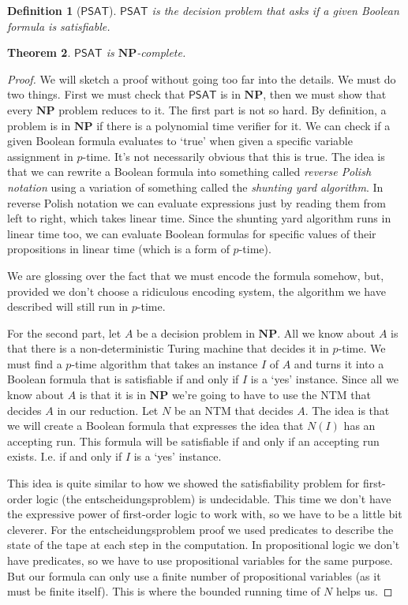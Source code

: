 \documentclass{article}
\theoremstyle{plain}
\newtheorem{theorem}{Theorem}[section]{\bfseries}{\itshape}
\newtheorem{definition}[theorem]{Definition}{\bfseries}{\upshape}
\theoremstyle{definition}
\newcommand{\NP}{\mathbf{NP}}
\newcommand{\SAT}{\mathsf{PSAT}}
\begin{document}
\begin{definition}[$\SAT$]
$\SAT$ is the decision problem that asks if a given Boolean formula is satisfiable.
\end{definition}

\begin{theorem}\label{T:cook}
$\SAT$ is $\NP$-complete.
\end{theorem}
\begin{proof}
We will sketch a proof without going too far into the details. We must do two things. First we must check that $\SAT$ is in $\NP$, then we must show that every $\NP$ problem reduces to it. The first part is not so hard. By definition, a problem is in $\NP$ if there is a polynomial time verifier for it. We can check if a given Boolean formula evaluates to `true' when given a specific variable assignment in $p$-time. It's not necessarily obvious that this is true. The idea is that we can rewrite a Boolean formula into something called \emph{reverse Polish notation} using a variation of something called the \emph{shunting yard algorithm}. In reverse Polish notation we can evaluate expressions just by reading them from left to right, which takes linear time. Since the shunting yard algorithm runs in linear time too, we can evaluate Boolean formulas for specific values of their propositions in linear time (which is a form of $p$-time). 

We are glossing over the fact that we must encode the formula somehow, but, provided we don't choose a ridiculous encoding system, the algorithm we have described will still run in $p$-time. 

For the second part, let $A$ be a decision problem in $\NP$. All we know about $A$ is that there is a non-deterministic Turing machine that decides it in $p$-time. We must find a $p$-time algorithm that takes an instance $I$ of $A$ and turns it into a Boolean formula that is satisfiable if and only if $I$ is a `yes' instance. Since all we know about $A$ is that it is in $\NP$ we're going to have to use the NTM that decides $A$ in our reduction. Let $N$ be an NTM that decides $A$. The idea is that we will create a Boolean formula that expresses the idea that $N(I)$ has an accepting run. This formula will be satisfiable if and only if an accepting run exists. I.e. if and only if $I$ is a `yes' instance.

This idea is quite similar to how we showed the satisfiability problem for first-order logic (the entscheidungsproblem) is undecidable. This time we don't have the expressive power of first-order logic to work with, so we have to be a little bit cleverer. For the entscheidungsproblem proof we used predicates to describe the state of the tape at each step in the computation. In propositional logic we don't have predicates, so we have to use propositional variables for the same purpose. But our formula can only use a finite number of propositional variables (as it must be finite itself). This is where the bounded running time of $N$ helps us.


\end{proof}
\end{document}
